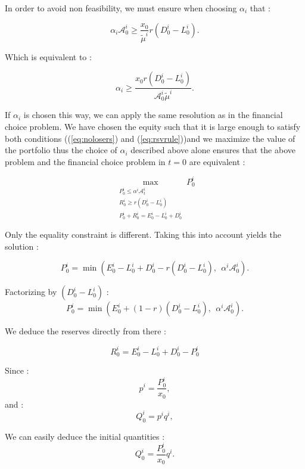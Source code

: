 \documentclass{article}
\begin{document}
\begin{appendices}
In order to avoid non feasibility, we must ensure when choosing $\alpha_i$ that :

$$ \alpha_i \mathcal{A}_0^i \geq \frac{x_0}{\tilde{\mu}^i}r(D_0^i - L_0^i).$$

Which is equivalent to : 

$$ \alpha_i \geq \frac{x_0 r(D_0^i - L_0^i)}{\mathcal{A}_0^i \tilde{\mu}^i}.$$

If $\alpha_i$ is chosen this way, we can apply the same resolution as in the financial choice problem. We have chosen the equity such that it is large enough to satisfy both conditions ((\ref{eq:nolosers}) and (\ref{eq:rsvrule}))and we maximize the value of the portfolio thus the choice of $\alpha_i$ described above alone ensures that the above problem and the financial choice problem in $t=0$ are equivalent : 

$$\max_{\substack{P_0^i \leq \alpha^i \mathcal{A}_t^i \\ R_0^i \geq r(D_0^i - L_0^i) \\ P_0^i + R_0^i = E_0^i - L_0^i + D_0^i}} P_0^i$$

Only the equality constraint is different. Taking this into account yields the solution : 

$$
P_0^i = \min(E_0^i - L_0^i + D_0^i - r(D_0^i - L_0^i),~~\alpha^i \mathcal{A}_0^i).
$$

Factorizing by $(D_0^i - L_0^i)$ :
$$
P_0^i = \min(E_0^i + (1 - r)(D_0^i - L_0^i),~~\alpha^i \mathcal{A}_0^i).
$$

We deduce the reserves directly from there : 

$$
R_0^i = E_0^i - L_0^i + D_0^i - P_0^i
$$

Since :
$$p^i = \frac{P_0^i}{x_0},$$ 
and : 
$$Q_0^i = p^i q^i,$$

We can easily deduce the initial quantities : 
$$Q_0^i = \frac{P_0^i}{x_0} q^i.$$











\end{appendices}
\end{document}
